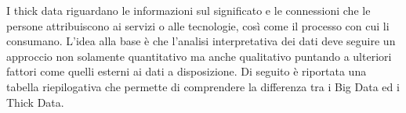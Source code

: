 I thick data riguardano le informazioni sul significato e le connessioni che le persone attribuiscono ai servizi o alle tecnologie, così come il processo con cui li consumano. L’idea alla base è che l’analisi interpretativa dei dati deve seguire un approccio non solamente quantitativo ma anche qualitativo puntando a ulteriori fattori come quelli esterni ai dati a disposizione. Di seguito è riportata una tabella riepilogativa che permette di comprendere la differenza tra i Big Data ed i Thick Data.\cite{big_data_and_thick_data}

